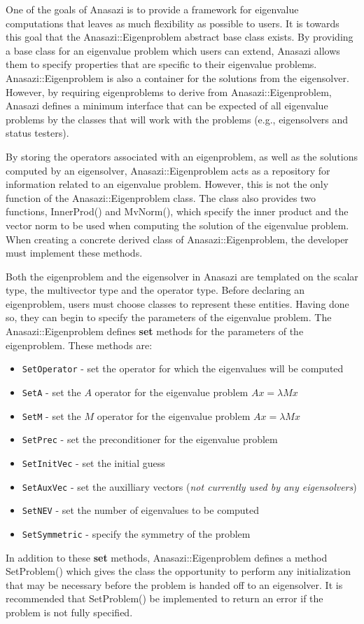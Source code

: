 One of the goals of Anasazi is to provide a framework for eigenvalue
computations that leaves as much flexibility as possible to users. It is towards
this goal that the Anasazi::Eigenproblem abstract base class exists. By
providing a base class for an eigenvalue problem which users can extend, Anasazi
allows them to specify properties that are specific to their eigenvalue
problems. Anasazi::Eigenproblem is also a container for the solutions
from the eigensolver. However, by requiring eigenproblems to derive from
Anasazi::Eigenproblem, Anasazi defines a minimum interface that can be
expected of all eigenvalue problems by the classes that will work with the
problems (e.g., eigensolvers and status testers).

By storing the operators associated with an eigenproblem, as well as the
solutions computed by an eigensolver, Anasazi::Eigenproblem acts as a
repository for information related to an eigenvalue problem. However, this is
not the only function of the Anasazi::Eigenproblem class. The class also
provides two functions, InnerProd() and MvNorm(), which specify
the inner product and the vector norm to be used when computing the solution of
the eigenvalue problem. When creating a concrete derived class of
Anasazi::Eigenproblem, the developer must implement these methods.

Both the eigenproblem and the eigensolver in Anasazi are templated 
on the scalar type, the multivector type and the operator type. Before
declaring an eigenproblem, users must choose classes to represent these
entities. Having done so, they can begin to specify the parameters of the
eigenvalue problem. The Anasazi::Eigenproblem defines \textbf{set} methods for
the parameters of the eigenproblem. These methods are:
\begin{itemize}
\item \verb!SetOperator! - set the operator for which the eigenvalues will be computed
\item \verb!SetA! - set the $A$ operator for the eigenvalue problem $A x = \lambda M x$
\item \verb!SetM! - set the $M$ operator for the eigenvalue problem $A x = \lambda M x$
\item \verb!SetPrec! - set the preconditioner for the eigenvalue problem
\item \verb!SetInitVec! - set the initial guess
\item \verb!SetAuxVec! - set the auxilliary vectors (\emph{not currently used by
any eigensolvers})
\item \verb!SetNEV! - set the number of eigenvalues to be computed
\item \verb!SetSymmetric! - specify the symmetry of the problem
\end{itemize}
In addition to these \textbf{set} methods, Anasazi::Eigenproblem defines
a method SetProblem() which gives the class the opportunity to perform
any initialization that may be necessary before the problem is handed off to an
eigensolver. It is recommended that SetProblem() be implemented to
return an error if the problem is not fully specified.

